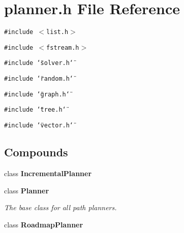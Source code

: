 \section{planner.h File Reference}
\label{planner_h}
{\tt \#include $<$list.h$>$}\par
{\tt \#include $<$fstream.h$>$}\par
{\tt \#include \char`\"{}solver.h\char`\"{}}\par
{\tt \#include \char`\"{}random.h\char`\"{}}\par
{\tt \#include \char`\"{}graph.h\char`\"{}}\par
{\tt \#include \char`\"{}tree.h\char`\"{}}\par
{\tt \#include \char`\"{}vector.h\char`\"{}}\par
\subsection*{Compounds}
\begin{CompactItemize}
\item 
class {\bf Incremental\-Planner}
\item 
class {\bf Planner}
\begin{CompactList}\small\item\em The base class for all path planners.\item\end{CompactList}\item 
class {\bf Roadmap\-Planner}
\end{CompactItemize}
